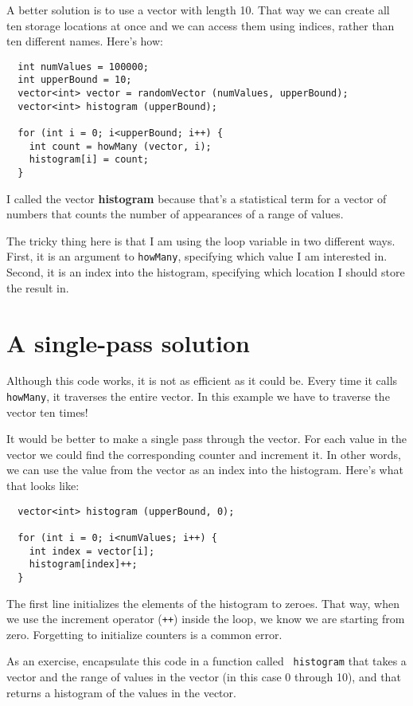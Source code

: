 A better solution is to use a vector with length 10.  That
way we can create all ten storage locations at once and we
can access them using indices, rather than ten different names.
Here's how:

\begin{verbatim}
  int numValues = 100000;
  int upperBound = 10;
  vector<int> vector = randomVector (numValues, upperBound);
  vector<int> histogram (upperBound);

  for (int i = 0; i<upperBound; i++) {
    int count = howMany (vector, i);
    histogram[i] = count;
  }
\end{verbatim}
%
I called the vector {\bf histogram} because that's
a statistical term for a vector of numbers that counts the
number of appearances of a range of values.


The tricky thing here is that I am using the loop variable
in two different ways.  First, it is an argument to {\tt howMany},
specifying which value I am interested in.  Second, it is
an index into the histogram, specifying which location I should
store the result in.

\section{A single-pass solution}

Although this code works, it is not as efficient as it could
be.  Every time it calls {\tt howMany}, it traverses the
entire vector.  In this example we have to traverse the
vector ten times!

It would be better to make a single pass through the vector.
For each value in the vector we could find the corresponding
counter and increment it.  In other words, we can use the
value from the vector as an index into the histogram.  Here's
what that looks like:

\begin{verbatim}
  vector<int> histogram (upperBound, 0);

  for (int i = 0; i<numValues; i++) {
    int index = vector[i];
    histogram[index]++;
  }
\end{verbatim}
%
The first line initializes the elements of the histogram to
zeroes.  That way, when we use the increment
operator ({\tt ++}) inside the loop, we know we are starting from zero.
Forgetting to initialize counters is a common error.

As an exercise, encapsulate this code in a function called {\tt
histogram} that takes a vector and the range of values in the vector
(in this case 0 through 10), and that returns a histogram of the
values in the vector.

